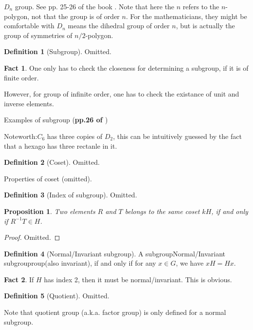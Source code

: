 \documentclass{article}
\numberwithin{equation}{subsection} %
\newtheorem{prop}{Proposition}[section]
\theoremstyle{definition}
\newtheorem{defi}{Definition}[section]
\newtheorem{fact}{Fact}[section]
\begin{document}
$D_n$ group. See pp. 25-26 of the book \cite{book}.
Note that here the $n$ refers to the $n$-polygon, not that the group is
of order $n$. For the mathematicians, they might be comfortable with
$D_n$ means the dihedral group of order $n$, but is actually the group of
symmetries of $n/2$-polygon.

\begin{defi}[Subgroup]
    Omitted.
\end{defi}
\begin{fact}
    One only has to check the closeness for determining a subgroup, if it
    is of finite order.

    However, for group of infinite order, one has to check the existance
    of unit and inverse elements.
\end{fact}
Examples of subgroup (\textbf{pp.26 of \cite{book}})

Noteworth:$C_6$ has three copies of $D_2$, this can be intuitively 
guessed by the fact that a hexago has three rectanle in it.

\begin{defi}[Coset]
    Omitted.
\end{defi}
Properties of coset (omitted).

\begin{defi}[Index of subgroup]
    Omitted.
\end{defi}

\begin{prop}
    Two elements $R$ and $T$ belongs to the same coset $kH$, if and only
    if $R^{-1}T\in H$.
\end{prop}
\begin{proof}
    Omitted.
\end{proof}
\begin{defi}[Normal/Invariant subgroup]
    A subgroupNormal/Invariant subgrouproup(also invariant), if and only
    if for any $x\in G$, we have $xH = Hx$.
\end{defi}
\begin{fact}
    If $H$ has index 2, then it must be normal/invariant. This is
    obvious.
\end{fact}
\begin{defi}[Quotient]
    Omitted.
\end{defi}
Note that quotient group (a.k.a. factor group) is only defined for a normal subgroup.
\end{document}
